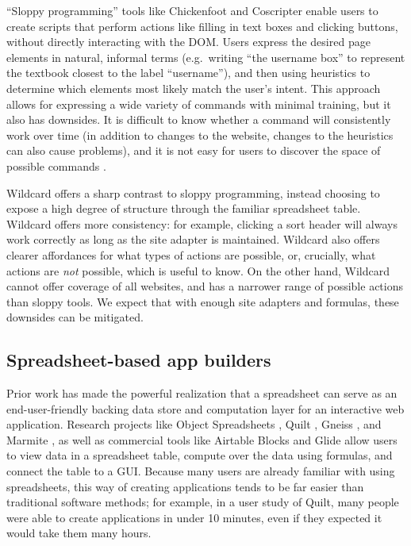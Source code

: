 \documentclass[english,submission]{programming}
\begin{document}
``Sloppy programming'' \autocite{little2010} tools like Chickenfoot
\autocite{bolin2005} and Coscripter \autocite{leshed2008} enable users
to create scripts that perform actions like filling in text boxes and
clicking buttons, without directly interacting with the DOM. Users
express the desired page elements in natural, informal terms
(e.g.~writing ``the username box'' to represent the textbook closest to
the label ``username''), and then using heuristics to determine which
elements most likely match the user's intent. This approach allows for
expressing a wide variety of commands with minimal training, but it also
has downsides. It is difficult to know whether a command will
consistently work over time (in addition to changes to the website,
changes to the heuristics can also cause problems), and it is not easy
for users to discover the space of possible commands
\autocite{little2010}.

Wildcard offers a sharp contrast to sloppy programming, instead choosing
to expose a high degree of structure through the familiar spreadsheet
table. Wildcard offers more consistency: for example, clicking a sort
header will always work correctly as long as the site adapter is
maintained. Wildcard also offers clearer affordances for what types of
actions are possible, or, crucially, what actions are \emph{not}
possible, which is useful to know. On the other hand, Wildcard cannot
offer coverage of all websites, and has a narrower range of possible
actions than sloppy tools. We expect that with enough site adapters and
formulas, these downsides can be mitigated.

\hypertarget{spreadsheet-based-app-builders}{%
\subsection{Spreadsheet-based app
builders}\label{spreadsheet-based-app-builders}}

Prior work has made the powerful realization that a spreadsheet can
serve as an end-user-friendly backing data store and computation layer
for an interactive web application. Research projects like Object
Spreadsheets \autocite{mccutchen2016}, Quilt \autocite{benson2014},
Gneiss \autocite{chang2014}, and Marmite \autocite{wong2007}, as well as
commercial tools like Airtable Blocks \autocite{zotero-79} and Glide
\autocite{zotero-81} allow users to view data in a spreadsheet table,
compute over the data using formulas, and connect the table to a GUI.
Because many users are already familiar with using spreadsheets, this
way of creating applications tends to be far easier than traditional
software methods; for example, in a user study of Quilt, many people
were able to create applications in under 10 minutes, even if they
expected it would take them many hours.
\end{document}
